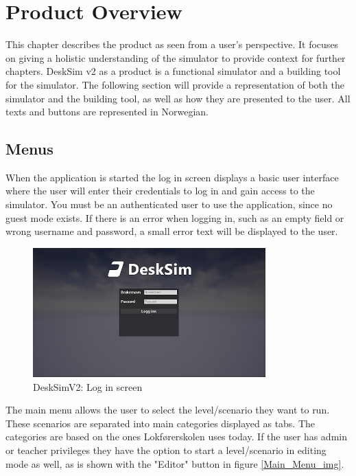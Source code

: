 \chapter{Product Overview}

% 

This chapter describes the product as seen from a user's perspective. It focuses on giving a holistic understanding of the simulator to provide context for further chapters. DeskSim v2 as a product is a functional simulator and a building tool for the simulator. The following section will provide a representation of both the simulator and the building tool, as well as how they are presented to the user. All texts and buttons are represented in Norwegian. 

\section{Menus}

When the application is started the log in screen displays a basic user interface where the user will enter their credentials to log in and gain access to the simulator. You must be an authenticated user to use the application, since no guest mode exists. If there is an error when logging in, such as an empty field or wrong username and password, a small error text will be displayed to the user. 

\begin{figure}[H]
    \centering
    \includegraphics[width=0.8\textwidth]{figures/LogIn1.PNG}
    \caption{DeskSimV2: Log in screen}
    \label{Log_in_menu_img}
\end{figure} 


The main menu allows the user to select the level/scenario they want to run. These scenarios are separated into main categories displayed as tabs. The categories are based on the ones Lokførerskolen uses today. If the user has admin or teacher privileges they have the option to start a level/scenario in editing mode as well, as is shown with the "Editor" button in figure \ref{Main_Menu_img}.

